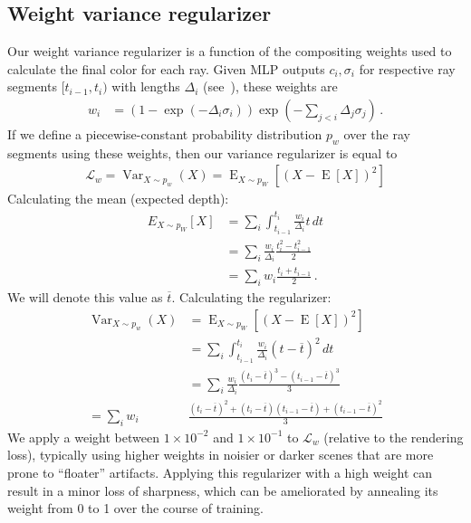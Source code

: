 \subsection{Weight variance regularizer}

Our weight variance regularizer is a function of the compositing weights used to calculate the final color for each ray. Given MLP outputs $c_i, \sigma_i$ for respective ray segments $[t_{i-1}, t_i)$ with lengths $\Delta_i$ (see~\cite{barron2021}), these weights are 
\begin{align}
    w_i &= (1-\exp(-\Delta_i \sigma_i)) \exp\!\left(-\sum_{j < i} \Delta_j \sigma_j\right) \, .
\end{align}
If we define a piecewise-constant probability distribution $p_w$ over the ray segments using these weights, then our variance regularizer is equal to 
\begin{align}
    \mathcal L_w = \operatorname{Var}_{X \sim p_w}(X) = \operatorname{E}_{X\sim p_W}\left[(X - \operatorname{E}[X])^2 \right]
\end{align}
Calculating the mean (expected depth):
\begin{align}
    E_{X\sim p_W}[X] &= \sum_i \int_{t_{i-1}}^{t_i} \frac{w_i}{\Delta_i} t \, dt \\
    &= \sum_i \frac{w_i}{\Delta_i} \frac{t_i^2 - t_{i-1}^2}{2} \\
    &= \sum_i w_i \frac{t_i + t_{i-1}}{2} \, .
\end{align}
We will denote this value as $\overline{t}$. Calculating the regularizer:
\begin{align}
    \operatorname{Var}_{X \sim p_w}(X) &= \operatorname{E}_{X\sim p_W}\left[(X - \operatorname{E}[X])^2 \right] \\
    &= \sum_i \int_{t_{i-1}}^{t_i} \frac{w_i}{\Delta_i} \left(t-\overline t \right)^2 \, dt \\
    &= \sum_i \frac{w_i}{\Delta_i} \frac{\left(t_i-\overline t \right)^3 - \left( t_{i-1}-\overline t \right)^3}{3} \\
    = \sum_i  w_i& \frac{(t_i-\overline t)^2 + \left( t_i-\overline t \right) \left(t_{i-1}-\overline t \right) + \left( t_{i-1}-\overline t \right)^2}{3} 
\end{align}
We apply a weight between $1 \times 10^{-2}$ and $1 \times 10^{-1}$ to $\mathcal L_w$ (relative to the rendering loss), typically using higher weights in noisier or darker scenes that are more prone to ``floater'' artifacts. Applying this regularizer with a high weight can result in a minor loss of sharpness, which can be ameliorated by annealing its weight from 0 to 1 over the course of training.



